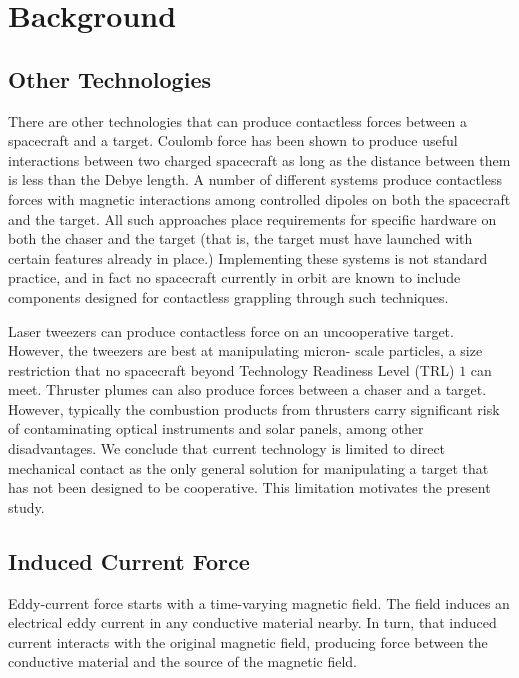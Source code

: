 \section{Background}
\subsection{Other Technologies}

There are other technologies that can produce contactless forces between a spacecraft and a target. Coulomb force has been shown to produce useful interactions between two charged spacecraft as long as the distance between them is less than the Debye length. \cite{coulombtether} A number of different systems produce contactless forces with magnetic interactions among controlled dipoles on both the spacecraft and the target.\cite{dipoleplanning} \cite{Kong2004}
All such approaches place requirements for specific hardware on both the chaser and the target (that is, the target must have launched with certain features already in place.) Implementing these systems is not standard practice, and in fact no spacecraft currently in orbit are known to include components designed for contactless grappling through such techniques.

Laser tweezers can produce contactless force on an uncooperative target. \cite{lasertweezers}However, the tweezers are best at manipulating micron- scale particles, a size restriction that no spacecraft beyond Technology Readiness Level (TRL) $1$ can meet. \cite{lasermirrors} Thruster plumes can also produce forces between a chaser and a target. However, typically the combustion products from thrusters carry significant risk of contaminating optical instruments and solar panels, among other disadvantages. We conclude that current technology is limited to direct mechanical contact as the only general solution for manipulating a target that has not been designed to be cooperative.  This limitation motivates the present study.

\subsection{Induced Current Force}

Eddy-current force starts with a time-varying magnetic field. The field induces an electrical eddy current in any conductive material nearby. In turn, that induced current interacts with the original magnetic field, producing force between the conductive material and the source of the magnetic field.


